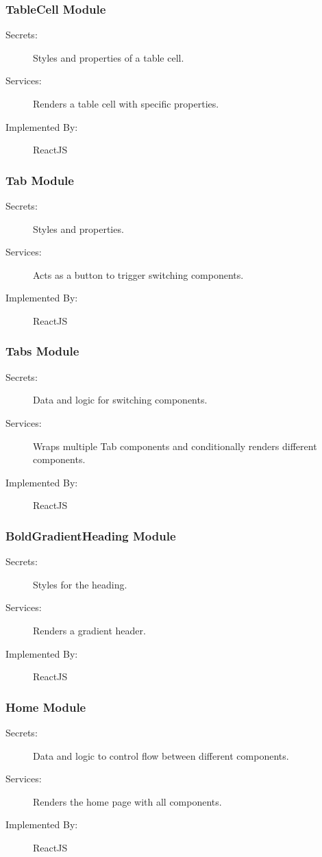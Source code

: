 \documentclass[12pt, titlepage]{article}
\begin{document}
\subsubsection{TableCell Module \label{mTableCellModule}}
\begin{description}
\item[Secrets:]Styles and properties of a table cell.
\item[Services:]Renders a table cell with specific properties.
\item[Implemented By:] ReactJS
\end{description}

\subsubsection{Tab Module \label{mTabModule}}
\begin{description}
\item[Secrets:]Styles and properties.
\item[Services:]Acts as a button to trigger switching components.
\item[Implemented By:] ReactJS
\end{description}

\subsubsection{Tabs Module \label{mTabsModule}}
\begin{description}
\item[Secrets:]Data and logic for switching components.
\item[Services:]Wraps multiple Tab components and conditionally renders different components.
\item[Implemented By:] ReactJS
\end{description}

\subsubsection{BoldGradientHeading Module \label{mBoldGradientHeadingModule}}
\begin{description}
\item[Secrets:]Styles for the heading.
\item[Services:]Renders a gradient header.
\item[Implemented By:] ReactJS
\end{description}

\subsubsection{Home Module \label{mHomeModule}}
\begin{description}
\item[Secrets:]Data and logic to control flow between different components.
\item[Services:]Renders the home page with all components.
\item[Implemented By:] ReactJS
\end{description}
\end{document}
